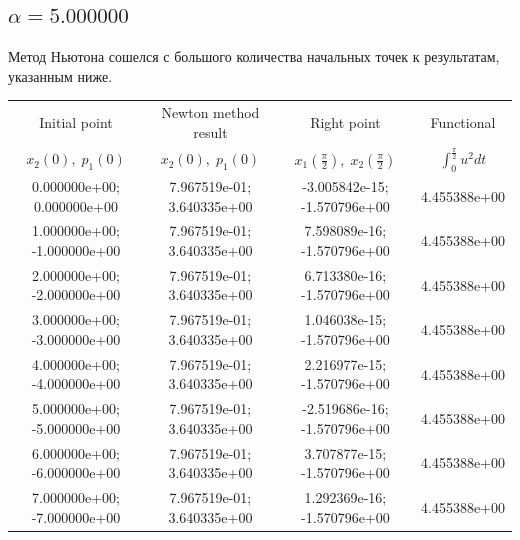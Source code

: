 \documentclass[titlepage]{article}
\def\l{\left}
\def\r{\right}
\begin{document}
\subsection{$\alpha = 5.000000$} 
Метод Ньютона сошелся с большого количества начальных точек к результатам, указанным ниже. \\ 
\begin{tabular}{ | c | c | c | c |} 
\hline 
Initial point  & Newton method result & Right point & Functional 
 \\ $x_2(0), \; p_1(0)$ & $x_2(0), \; p_1(0)$ & $x_1\l(\frac{\pi}{2}\r), \; x_2\l(\frac{\pi}{2}\r)$ & $\int_{0}^{\frac{\pi}{2}}u^2dt$  \\ \hline 
0.000000e+00; 0.000000e+00 & 7.967519e-01; 3.640335e+00 & -3.005842e-15; -1.570796e+00 & 4.455388e+00 \\ \hline 
1.000000e+00; -1.000000e+00 & 7.967519e-01; 3.640335e+00 & 7.598089e-16; -1.570796e+00 & 4.455388e+00 \\ \hline 
2.000000e+00; -2.000000e+00 & 7.967519e-01; 3.640335e+00 & 6.713380e-16; -1.570796e+00 & 4.455388e+00 \\ \hline 
3.000000e+00; -3.000000e+00 & 7.967519e-01; 3.640335e+00 & 1.046038e-15; -1.570796e+00 & 4.455388e+00 \\ \hline 
4.000000e+00; -4.000000e+00 & 7.967519e-01; 3.640335e+00 & 2.216977e-15; -1.570796e+00 & 4.455388e+00 \\ \hline 
5.000000e+00; -5.000000e+00 & 7.967519e-01; 3.640335e+00 & -2.519686e-16; -1.570796e+00 & 4.455388e+00 \\ \hline 
6.000000e+00; -6.000000e+00 & 7.967519e-01; 3.640335e+00 & 3.707877e-15; -1.570796e+00 & 4.455388e+00 \\ \hline 
7.000000e+00; -7.000000e+00 & 7.967519e-01; 3.640335e+00 & 1.292369e-16; -1.570796e+00 & 4.455388e+00 \\ \hline 
\end{tabular} 
\end{document}
